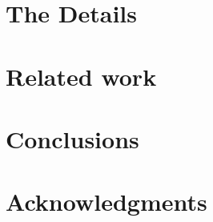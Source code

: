 \documentclass{acm_proc_article-sp}
\begin{document}
\section{The Details}

\section{Related work}

\section{Conclusions}

\section{Acknowledgments}





\end{document}
